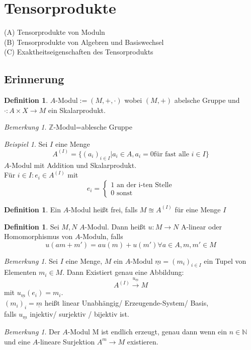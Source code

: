 \documentclass[10pt,a4paper]{article}
\newcommand{\N}{\ensuremath{\mathbb{N}}}
\newcommand{\Z}{\ensuremath{\mathbb{Z}}}
\newcounter{thm}[section]
\theoremstyle{definition}
\newtheorem{definition}[thm]{Definition}
\theoremstyle{plain}
\theoremstyle{remark}
\newtheorem{bem}[thm]{Bemerkung}
\newtheorem{exm}[thm]{Beispiel}
\begin{document}
\section{Tensorprodukte}
	(A) Tensorprodukte von Moduln\\
	(B) Tensorprodukte von Algebren und Basiswechsel\\
	(C) Exaktheitseigenschaften des Tensorprodukts\\
	
	
\subsection{Erinnerung}


\begin{definition}
	$A$-Modul$:=(M,+,\cdot)$ wobei $(M,+)$ abelsche Gruppe und $\cdot:A\times X\rightarrow M$ ein Skalarprodukt.
\end{definition}
\begin{bem}
	$\Z$-Modul=ablesche Gruppe
\end{bem}
\begin{exm}
	Sei $I$ eine Menge
	\[A^{(I)}=\{(a_i)_{i\in I}|a_i\in A, a_i=0\text{für fast alle $i\in I$}\}\]
	$A$-Modul mit Addition und Skalarprodukt.\\
	Für $i\in I:e_i\in A^{(I)}$ mit
	\[e_i=\begin{cases}
	\text{1 an der i-ten Stelle}\\
	\text{0 sonst}
	\end{cases}\]
\end{exm}
\begin{definition}
	Ein $A$-Modul heißt frei, falls $M\approxeq A^{(I)}$ für eine Menge $I$
\end{definition}
\begin{definition}
	Sei $M,N$ $A$-Modul. Dann heißt $u:M\rightarrow N$ A-linear oder Homomorphismus von $A$-Moduln, falls
	\[u(am+m')=au(m)+u(m')\forall a\in A,m,m'\in M\]
\end{definition}
\begin{bem}
	Sei $I$ eine Menge, $M$ ein $A$-Modul $\underline{m}=(m_i)_{i\in I}$ ein Tupel von Elementen $m_i\in M$. Dann Existiert genau eine Abbildung:
	\[A^{(I)}\xrightarrow{u_{\underline m} }M\]
	mit $u_{\underline{m}}(e_i)=m_i$.\\
	$(m_i)_i=\underline{m}$ heißt linear Unabhängig/ Erzeugende-System/ Basis, \\
	falls $u_{\underline{m}}$ injektiv/ surjektiv / bijektiv ist.
\end{bem}
\begin{bem}
	Der $A$-Modul M ist endlich erzeugt, genau dann wenn ein $n\in \N$und eine $A$-lineare Surjektion $A^m\rightarrow M$ existieren.
\end{bem}
\end{document}
